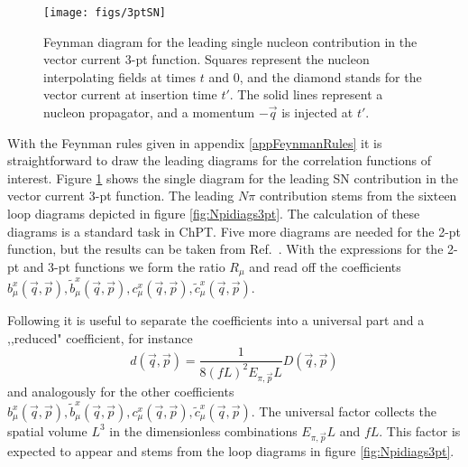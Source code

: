 \documentclass[11pt,prd,aps,showpacs,eqsecnum,floatfix,nofootinbib,preprint,tightenlines]{revtex4}
\newcommand{\Epip}{E_{\pi, \vec{p}}}
\begin{document}
\begin{figure}[t]
\begin{center}
\texttt{[image: figs/3ptSN]}\\
\caption{Feynman diagram for the leading single nucleon contribution in the  vector current 3-pt function. Squares represent the nucleon interpolating fields at times $t$ and $0$, and the diamond stands for the vector current at insertion time $t'$.
The solid lines represent a nucleon propagator, and a momentum $-\vec{q}$ is injected at $t'$.
}
\label{fig:diagsSN}
\end{center}
\end{figure}

With the Feynman rules given in appendix \ref{appFeynmanRules} it is straightforward to draw the leading diagrams for the correlation functions of interest. Figure \ref{fig:diagsSN} shows the single diagram for the leading SN contribution in the vector current 3-pt function. The leading $N\pi$ contribution stems from the sixteen loop diagrams depicted in figure \ref{fig:Npidiags3pt}. The calculation of these diagrams is a standard task in ChPT. Five more diagrams are needed for the 2-pt function, but the results can be taken from Ref.\ \cite{Bar:2018xyi}. 
With the expressions for the 2-pt and 3-pt functions we form the ratio $R_{\mu}$ and read off the coefficients $b^x_{\mu}(\vec{q},\vec{p}) ,\tilde{b}^x_{\mu}(\vec{q},\vec{p}), c^x_{\mu}(\vec{q},\vec{p}), \tilde{c}^x_{\mu}(\vec{q},\vec{p})$.

Following \cite{Bar:2018xyi} it is useful to separate the coefficients into a universal part and a ,,reduced" coefficient, for instance
\begin{equation}\label{DefRedCoeff}
d(\vec{q},\vec{p}) =   \frac{1}{8 (fL)^2 \Epip L} D(\vec{q},\vec{p})
\end{equation}
and analogously for the other coefficients $b^x_{\mu}(\vec{q},\vec{p}) ,\tilde{b}^x_{\mu}(\vec{q},\vec{p}), c^x_{\mu}(\vec{q},\vec{p}), \tilde{c}^x_{\mu}(\vec{q},\vec{p})$.
The universal factor collects the spatial volume $L^3$ in the dimensionless combinations $\Epip L$ and $fL$. This factor is expected to appear and stems from the loop diagrams in figure \ref{fig:Npidiags3pt}.
\end{document}
